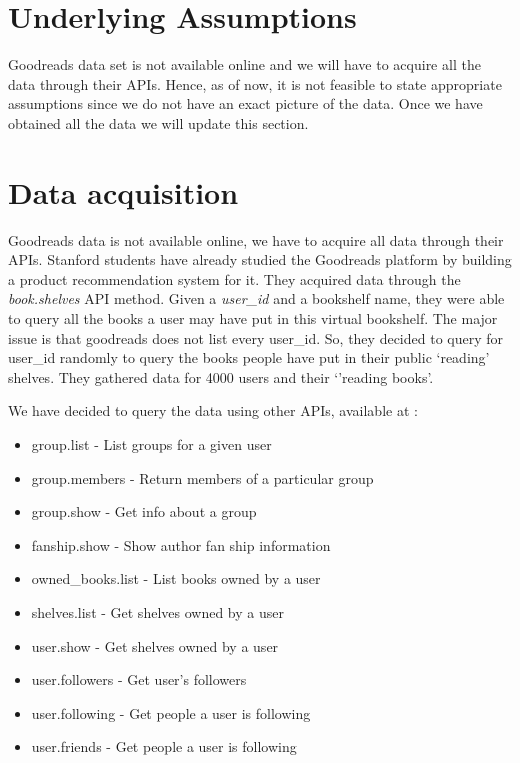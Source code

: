\documentclass[11pt]{article}
\begin{document}
\section{Underlying Assumptions}

Goodreads data set is not available online and  we will have to acquire all the data through their APIs. Hence, as of now, it is not feasible to state appropriate assumptions since we do not have an exact picture of the data. Once we have obtained all the data we will update this section.

\section{Data acquisition}

Goodreads data is not available online, we have to acquire all data through their APIs. Stanford students have already studied the Goodreads platform by building a product recommendation system for it\cite{stanford:goodreads}. They acquired data through the \textit{book.shelves} API method. Given a \textit{user\_id} and a bookshelf name, they were able to query all the books a user may have put in this virtual bookshelf. The major issue is that goodreads does not list every user\_id. So, they decided to query for user\_id randomly to query the books people have put in their public ‘reading' shelves. They gathered data for 4000 users and their `'reading books'.

We have decided to query the data using other APIs, available at \cite{goodreads:api}:
\begin{itemize}
\item group.list - List groups for a given user
\item group.members - Return members of a particular group
\item group.show - Get info about a group
\item fanship.show - Show author fan ship information
\item owned\_books.list - List books owned by a user
\item shelves.list - Get shelves owned by a user
\item user.show - Get shelves owned by a user
\item user.followers - Get user's followers
\item user.following - Get people a user is following
\item user.friends - Get people a user is following
\end{itemize}
\end{document}
